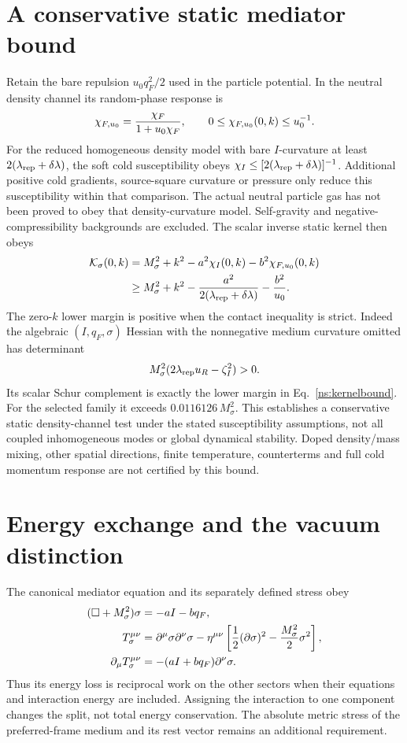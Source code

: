 \documentclass[11pt]{article}
\begin{document}
\section{A conservative static mediator bound}
Retain the bare repulsion $u_0q_F^2/2$ used in the particle potential.
In the neutral density channel its random-phase response is
\begin{equation}
 \chi_{F,u_0}={\chi_F\over1+u_0\chi_F},\qquad
 0\leq\chi_{F,u_0}(0,k)\leq u_0^{-1}.
\end{equation}
For the reduced homogeneous density model with bare $I$-curvature at least
$2(\lambda_{\rm rep}+\delta\lambda)$, the soft cold susceptibility obeys
$\chi_I\leq[2(\lambda_{\rm rep}+\delta\lambda)]^{-1}$.
Additional positive cold gradients, source-square curvature or pressure
only reduce this susceptibility within that comparison. The actual neutral
particle gas has not been proved to obey that density-curvature model.
Self-gravity and negative-compressibility backgrounds are excluded.
The scalar inverse static kernel then obeys
\begin{align}
 \mathcal K_\sigma(0,k)
 &=M_\sigma^2+k^2-a^2\chi_I(0,k)
                 -b^2\chi_{F,u_0}(0,k)\\
 &\geq M_\sigma^2+k^2
       -{a^2\over2(\lambda_{\rm rep}+\delta\lambda)}-{b^2\over u_0}.
 \label{ns:kernelbound}
\end{align}
The zero-$k$ lower margin is positive when the contact inequality is strict.
Indeed the algebraic $(I,q_F,\sigma)$ Hessian with the nonnegative medium
curvature omitted has determinant
\begin{equation}
 M_\sigma^2(2\lambda_{\rm rep}u_R-\zeta_I^2)>0.
\end{equation}
Its scalar Schur complement is exactly the lower margin in
Eq.~\eqref{ns:kernelbound}. For the selected family it exceeds
$0.0116126\,M_\sigma^2$. This establishes a conservative static density-channel
test under the stated susceptibility assumptions, not all coupled
inhomogeneous modes or global dynamical stability. Doped density/mass mixing,
other spatial directions, finite temperature, counterterms and full cold
momentum response are not certified by this bound.

\section{Energy exchange and the vacuum distinction}
The canonical mediator equation and its separately defined stress obey
\begin{align}
 (\Box+M_\sigma^2)\sigma&=-aI-bq_F,\\
 T_\sigma^{\mu\nu}&=\partial^\mu\sigma\partial^\nu\sigma
  -\eta^{\mu\nu}\left[{1\over2}(\partial\sigma)^2
                         -{M_\sigma^2\over2}\sigma^2\right],\\
 \partial_\mu T_\sigma^{\mu\nu}
     &=-(aI+bq_F)\partial^\nu\sigma.
\end{align}
Thus its energy loss is reciprocal work on the other sectors when their
equations and interaction energy are included. Assigning the interaction
to one component changes the split, not total energy conservation.
The absolute metric stress of the preferred-frame medium and its rest
vector remains an additional requirement.
\end{document}
